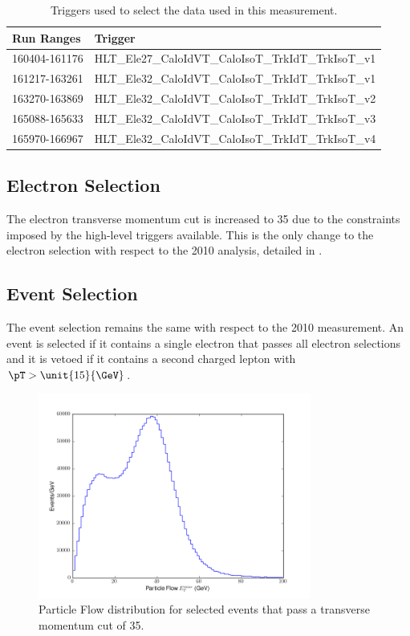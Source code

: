 \begin{table}[htbp]
  \begin{center}
    \leavevmode
     \begin{tabular}{ll} 
\toprule
      Run Ranges & Trigger  \\
     \midrule
     160404-161176 & HLT\_Ele27\_CaloIdVT\_CaloIsoT\_TrkIdT\_TrkIsoT\_v1  \\
     161217-163261 & HLT\_Ele32\_CaloIdVT\_CaloIsoT\_TrkIdT\_TrkIsoT\_v1  \\
     163270-163869 & HLT\_Ele32\_CaloIdVT\_CaloIsoT\_TrkIdT\_TrkIsoT\_v2  \\
     165088-165633 & HLT\_Ele32\_CaloIdVT\_CaloIsoT\_TrkIdT\_TrkIsoT\_v3  \\
     165970-166967 & HLT\_Ele32\_CaloIdVT\_CaloIsoT\_TrkIdT\_TrkIsoT\_v4  \\
\bottomrule
     \end{tabular}
  \caption{Triggers used to select the data used in this measurement.}
  \label{tab:updatedtriggers}
   \end{center}
\end{table}

\subsection{Electron Selection}

The electron transverse momentum cut is increased to \unit{35}{\GeV} due to the
constraints imposed by the high-level triggers available.  This is the only
change to the electron selection with respect to the 2010 analysis, detailed in
.

\subsection{Event Selection}
The event selection remains the same with respect to the 2010 measurement.
An event is selected if it contains a single electron that passes all electron
selections and it is vetoed if it contains a second charged lepton with
$\pT>\unit{15}{\GeV}$.

\begin{figure}[htbp]
  \centering
  \includegraphics*[width=0.8\textwidth]{pfmet_update}
  \caption{Particle Flow \ETm distribution for selected events that pass a
transverse momentum cut of \unit{35}{\GeV}.}
  \label{fig:pfmet}
\end{figure}

